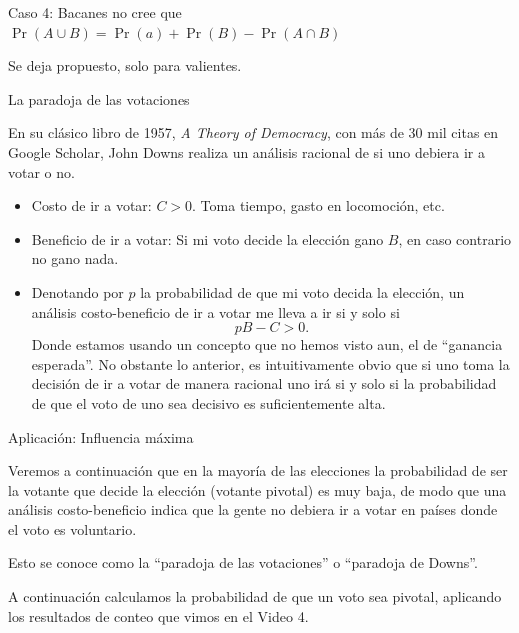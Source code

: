 \documentclass[9pt,handout]{beamer}
\begin{document}
\begin{frame}{Caso 4: Bacanes no cree que $\Pr(A\cup B) = \Pr(a)+\Pr(B)-\Pr(A\cap B)$}
\begin{center}
{\Huge Se deja propuesto, solo para valientes. }
\end{center}
\end{frame}



\begin{frame}{La paradoja de las votaciones}

En su clásico libro de 1957, \emph{A Theory of Democracy}, 
con más de 30 mil citas en Google Scholar, John Downs
realiza un análisis racional de si uno debiera ir a votar o no. 

\begin{itemize}
\item Costo de ir a votar: $C>0$. Toma tiempo, gasto en locomoción, etc. 
\item Beneficio de ir a votar: Si mi voto decide la elección gano $B$,
    en caso contrario no gano nada.
\item Denotando por $p$
    la probabilidad de que mi voto decida la elección, un análisis 
    costo-beneficio de ir a votar me lleva a ir si y solo si
    \[
    pB - C > 0.
    \]
    Donde estamos usando un concepto que no hemos visto
    aun, el de ``ganancia esperada''. No obstante lo anterior, 
    es intuitivamente obvio que si uno toma la decisión
    de ir a votar de manera racional uno irá si y solo si
    la probabilidad de que el voto de uno sea decisivo
    es suficientemente alta. 
\end{itemize} 
\end{frame}


\begin{frame}{Aplicación: Influencia máxima}

Veremos a continuación que en la mayoría
de las elecciones la probabilidad de ser
la votante que decide la elección (votante
\alert{pivotal}) es muy baja, de modo que
una análisis costo-beneficio indica
que la gente no debiera ir a votar
en países donde el voto es voluntario. 

                    \bigskip
          
          Esto se conoce como
          la ``paradoja
          de las votaciones''
          o ``paradoja de Downs''.
          
          \bigskip
          
          A continuación calculamos la probabilidad
          de que un voto sea pivotal, aplicando 
          los resultados de conteo que vimos en el Video 4.
\end{frame}
\end{document}
